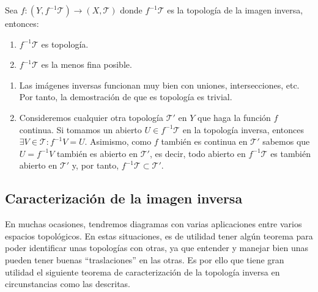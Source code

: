 \begin{prop}
Sea $f: (Y, f^{-1}\mathcal{T}) \rightarrow (X,\mathcal{T})$ donde $f^{-1}\mathcal{T}$ es la topología de la imagen inversa, entonces:
\begin{enumerate}
    \item $f^{-1}\mathcal{T}$ es topología. 
    \item $f^{-1}\mathcal{T}$ es la menos fina posible.
\end{enumerate}
\end{prop}
\begin{demo}
\begin{enumerate}
    \item Las imágenes inversas funcionan muy bien con uniones, intersecciones, etc. Por tanto, la demostración de que es topología es trivial.
    
    \item Consideremos cualquier otra topología $\mathcal{T}'$ en $Y$ que haga la función $f$ continua. Si tomamos un abierto $U \in f^{-1}\mathcal{T}$ en la topología inversa, entonces $\exists V \in \mathcal{T}: f^{-1}V = U$. Asimismo, como $f$ también es continua en $\mathcal{T}'$ sabemos que $U = f^{-1}V$ también es abierto en $\mathcal{T}'$, es decir, todo abierto en $f^{-1}\mathcal{T}$ es también abierto en $\mathcal{T}'$ y, por tanto, $f^{-1}\mathcal{T} \subset \mathcal{T}'$.
\end{enumerate}
\end{demo}

\subsection{Caracterización de la imagen inversa}
\label{sub:caracterizacion_de_la_imagen_inversa}
En muchas ocasiones, tendremos diagramas con varias aplicaciones entre varios espacios topológicos. En estas situaciones, es de utilidad tener algún teorema para poder identificar unas topologías con otras, ya que entender y manejar bien unas pueden tener buenas ``traslaciones'' en las otras. Es por ello que tiene gran utilidad el siguiente teorema de caracterización de la topología inversa en circunstancias como las descritas.

